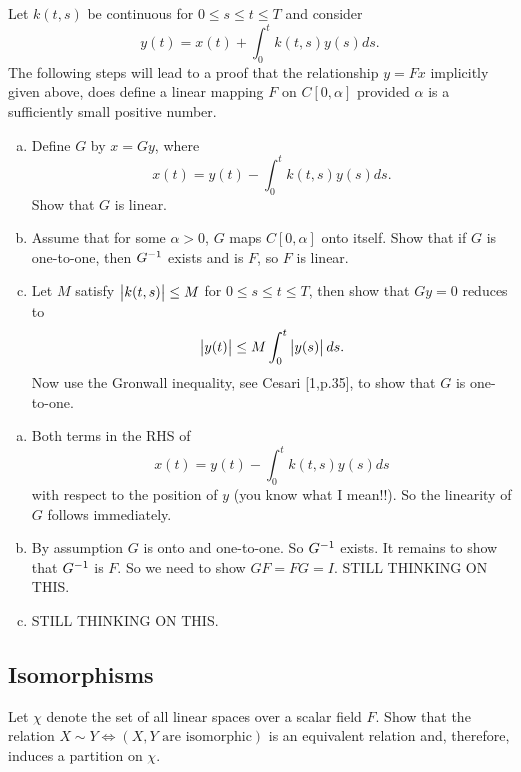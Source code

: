 \begin{problem}
	Let $ k(t,s) $ be continuous for $ 0\leq s\leq t \leq T $ and consider 
	\[ y(t) = x(t) + \int_{0}^{t} k(t,s)y(s)ds. \]
	The following steps will lead to a proof that the relationship $ y=Fx $ implicitly given above, does define a linear mapping $ F $ on $ C[0,\alpha] $ provided $ \alpha $ is a sufficiently small positive number. 
	\begin{enumerate}[(a)]
		\item Define $ G $ by $ x=Gy $, where
		\[ x(t) = y(t) - \int_{0}^{t}k(t,s) y(s) ds. \]
		Show that $ G $ is linear.
		
		\item Assume that for some $ \alpha > 0 $, $ G $ maps $ C[0,\alpha] $ onto itself. Show that if $ G $ is one-to-one, then $ G^{-1} $ exists and is $ F $, so $ F $ is linear.
		
		\item Let $ M $ satisfy $ \left|k(t,s)\right|\leq M $ for $ 0\leq s\leq t \leq T $, then show that $ Gy = 0 $ reduces to 
		\[ \left|y(t)\right| \leq M \int_{0}^{t} \left|y(s)\right|ds. \]
		Now use the Gronwall inequality, see Cesari [1,p.35], to show that $ G $ is one-to-one.
	\end{enumerate}
\end{problem}

\begin{solution}
	\begin{enumerate}[(a)]
		\item Both terms in the RHS of 
		\[ x(t) = y(t) - \int_{0}^{t}k(t,s)y(s)ds \]
		with respect to the position  of $ y $ (you know what I mean!!). So the linearity of $ G $ follows immediately.
		
		\item By assumption $ G $ is onto and one-to-one. So $ G^{-1} $ exists. It remains to show that $ G^{-1} $ is $ F $. So we need to show $ GF = FG = I $. STILL THINKING ON THIS.
		
		\item STILL THINKING ON THIS.
	\end{enumerate}
\end{solution}


\subsection{Isomorphisms}
\begin{problem}
	Let $ \chi $ denote the set of all linear spaces over a scalar field $ F $. Show that the relation $ X\sim Y  \Leftrightarrow (\text{$X,Y$ are isomorphic})$ is an equivalent relation and, therefore, induces a partition on $ \chi $.
\end{problem}

